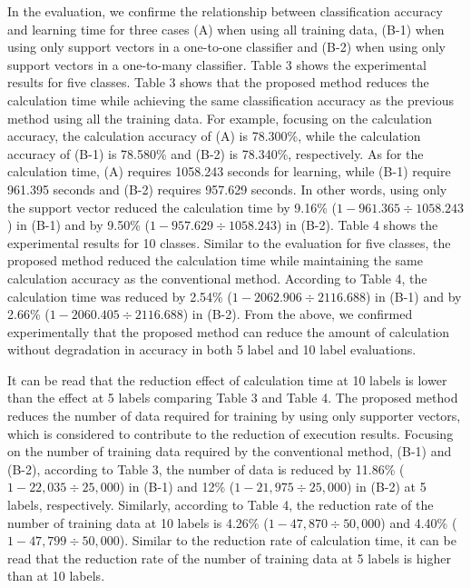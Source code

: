 In the evaluation, we confirme the relationship between classification accuracy and learning time for three cases (A) when using all training data, (B-1) when using only support vectors in a one-to-one classifier and (B-2) when using only support vectors in a one-to-many classifier. Table 3 shows the experimental results for five classes. Table 3 shows that the proposed method reduces the calculation time while achieving the same classification accuracy as the previous method using all the training data. For example, focusing on the calculation accuracy, the calculation accuracy of (A) is 78.300\%, while the calculation accuracy of (B-1) is 78.580\% and (B-2) is 78.340\%, respectively. As for the calculation time, (A) requires 1058.243 seconds for learning, while (B-1) require 961.395 seconds and (B-2) requires 957.629 seconds. In other words, using only the support vector reduced the calculation time by 9.16\% ($1-961.365\div1058.243$) in (B-1) and by 9.50\% ($1-957.629\div1058.243$) in (B-2). Table 4 shows the experimental results for 10 classes. Similar to the evaluation for five classes, the proposed method reduced the calculation time while maintaining the same calculation accuracy as the conventional method. According to Table 4, the calculation time was reduced by 2.54\% ($1-2062.906\div2116.688$) in (B-1) and by 2.66\% ($1-2060.405\div2116.688$) in (B-2). From the above, we confirmed experimentally that the proposed method can reduce the amount of calculation without degradation in accuracy in both 5 label and 10 label evaluations.

It can be read that the reduction effect of calculation time at 10 labels is lower than the effect at 5 labels comparing Table 3 and Table 4. The proposed method reduces the number of data required for training by using only supporter vectors, which is considered to contribute to the reduction of execution results. Focusing on the number of training data required by the conventional method, (B-1) and (B-2), according to Table 3, the number of data is reduced by 11.86\% ($1-22,035\div25,000$) in (B-1) and 12\% ($1-21,975\div25,000$) in (B-2) at 5 labels, respectively. Similarly, according to Table 4, the reduction rate of the number of training data at 10 labels is 4.26\% ($1-47,870\div50,000$) and 4.40\% ($1-47,799\div50,000$). Similar to the reduction rate of calculation time, it can be read that the reduction rate of the number of training data at 5 labels is higher than at 10 labels. 

